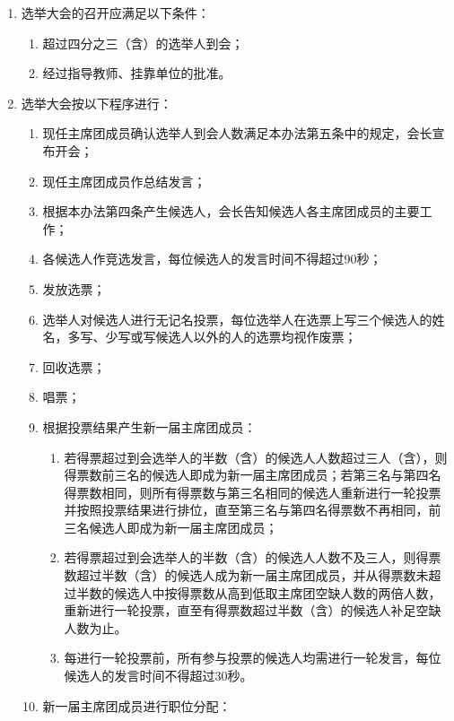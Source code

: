 \begin{enumerate}
    \item 选举大会的召开应满足以下条件：
    
    \begin{enumerate}
        \item 超过四分之三（含）的选举人到会；
        \item 经过指导教师、挂靠单位的批准。
    \end{enumerate}
    
    \item 选举大会按以下程序进行：
    
    \begin{enumerate}
        \item 现任主席团成员确认选举人到会人数满足本办法第五条中的规定，会长宣布开会；
        \item 现任主席团成员作总结发言；
        \item 根据本办法第四条产生候选人，会长告知候选人各主席团成员的主要工作；
        \item 各候选人作竞选发言，每位候选人的发言时间不得超过90秒；
        \item 发放选票；
        \item 选举人对候选人进行无记名投票，每位选举人在选票上写三个候选人的姓名，多写、少写或写候选人以外的人的选票均视作废票；
        \item 回收选票；
        \item 唱票；
        \item 根据投票结果产生新一届主席团成员：
        
        \begin{enumerate}
            \item 若得票超过到会选举人的半数（含）的候选人人数超过三人（含），则得票数前三名的候选人即成为新一届主席团成员；若第三名与第四名得票数相同，则所有得票数与第三名相同的候选人重新进行一轮投票并按照投票结果进行排位，直至第三名与第四名得票数不再相同，前三名候选人即成为新一届主席团成员；
            \item 若得票超过到会选举人的半数（含）的候选人人数不及三人，则得票数超过半数（含）的候选人成为新一届主席团成员，并从得票数未超过半数的候选人中按得票数从高到低取主席团空缺人数的两倍人数，重新进行一轮投票，直至有得票数超过半数（含）的候选人补足空缺人数为止。
            \item 每进行一轮投票前，所有参与投票的候选人均需进行一轮发言，每位候选人的发言时间不得超过30秒。
        \end{enumerate}
        
        \item 新一届主席团成员进行职位分配：
        

\end{enumerate}
\end{enumerate}
